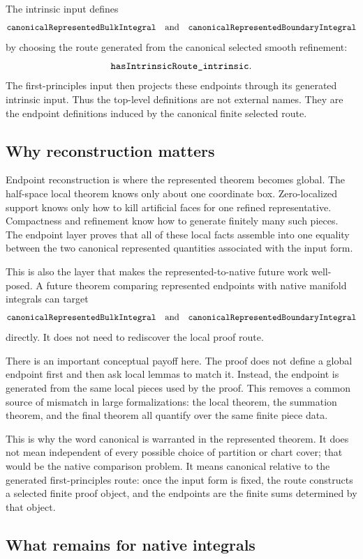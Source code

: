 The intrinsic input defines
\[
\code{canonicalRepresentedBulkIntegral}
\quad\text{and}\quad
\code{canonicalRepresentedBoundaryIntegral}
\]
by choosing the route generated from the canonical selected smooth refinement:
\[
\code{hasIntrinsicRoute_intrinsic}.
\]
The first-principles input then projects these endpoints through its generated
intrinsic input.  Thus the top-level definitions are not external names.  They
are the endpoint definitions induced by the canonical finite selected route.

\subsection{Why reconstruction matters}

Endpoint reconstruction is where the represented theorem becomes global.  The
half-space local theorem knows only about one coordinate box.  Zero-localized
support knows only how to kill artificial faces for one refined representative.
Compactness and refinement know how to generate finitely many such pieces.
The endpoint layer proves that all of these local facts assemble into one
equality between the two canonical represented quantities associated with the
input form.

This is also the layer that makes the represented-to-native future work
well-posed.  A future theorem comparing represented endpoints with native
manifold integrals can target
\[
\code{canonicalRepresentedBulkIntegral}
\quad\text{and}\quad
\code{canonicalRepresentedBoundaryIntegral}
\]
directly.  It does not need to rediscover the local proof route.

There is an important conceptual payoff here.  The proof does not define a
global endpoint first and then ask local lemmas to match it.  Instead, the
endpoint is generated from the same local pieces used by the proof.  This
removes a common source of mismatch in large formalizations: the local theorem,
the summation theorem, and the final theorem all quantify over the same finite
piece data.

This is why the word canonical is warranted in the represented theorem.  It
does not mean independent of every possible choice of partition or chart cover;
that would be the native comparison problem.  It means canonical relative to
the generated first-principles route: once the input form is fixed, the route
constructs a selected finite proof object, and the endpoints are the finite
sums determined by that object.

\subsection{What remains for native integrals}

